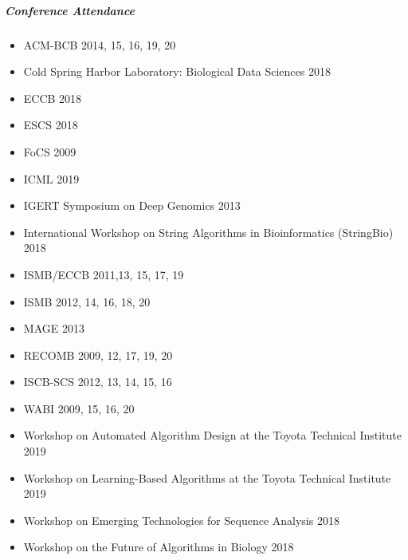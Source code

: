 \documentclass[10pt,letterpaper]{article}
\begin{document}
\subparagraph{Conference Attendance}
\begin{itemize}
	\item ACM-BCB 2014, 15, 16, 19, 20
	\item Cold Spring Harbor Laboratory: Biological Data Sciences 2018
	\item ECCB 2018
	\item ESCS 2018
	\item FoCS 2009
	\item ICML 2019
	\item IGERT Symposium on Deep Genomics 2013
	\item International Workshop on String Algorithms in Bioinformatics (StringBio) 2018
	\item ISMB/ECCB 2011,13, 15, 17, 19
	\item ISMB 2012, 14, 16, 18, 20
	\item MAGE 2013
	\item RECOMB 2009, 12, 17, 19, 20
	\item ISCB-SCS 2012, 13, 14, 15, 16
	\item WABI 2009, 15, 16, 20
	\item Workshop on Automated Algorithm Design at the Toyota Technical Institute 2019
	\item Workshop on Learning-Based Algorithms at the Toyota Technical Institute 2019
	\item Workshop on Emerging Technologies for Sequence Analysis 2018
	\item Workshop on the Future of Algorithms in Biology 2018
\end{itemize}
\end{document}
